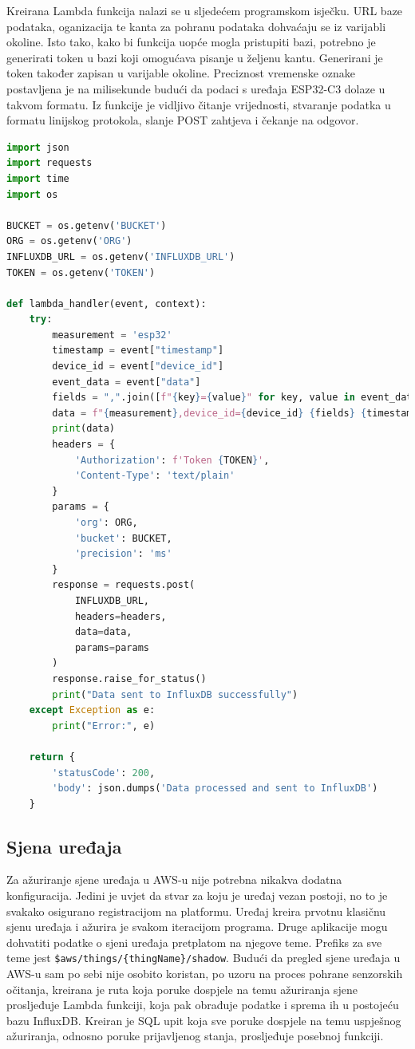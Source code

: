 Kreirana Lambda funkcija nalazi se u sljedećem programskom isječku. URL baze podataka, oganizacija te kanta za pohranu podataka dohvaćaju se iz varijabli okoline. Isto tako, kako bi funkcija uopće mogla pristupiti bazi, potrebno je generirati token u bazi koji omogućava pisanje u željenu kantu. Generirani je token također zapisan u varijable okoline. Preciznost vremenske oznake postavljena je na milisekunde budući da podaci s uređaja ESP32-C3 dolaze u takvom formatu. Iz funkcije je vidljivo čitanje vrijednosti, stvaranje podatka u formatu linijskog protokola, slanje POST zahtjeva i čekanje na odgovor. 

\begin{lstlisting}[caption={Lambda funkcija za slanje podataka u InfluxDB}, language={python}]
import json
import requests
import time
import os

BUCKET = os.getenv('BUCKET')
ORG = os.getenv('ORG')
INFLUXDB_URL = os.getenv('INFLUXDB_URL')
TOKEN = os.getenv('TOKEN')

def lambda_handler(event, context):
	try:
		measurement = 'esp32'
		timestamp = event["timestamp"]
		device_id = event["device_id"]
		event_data = event["data"]
		fields = ",".join([f"{key}={value}" for key, value in event_data.items() if key != "timestamp" and key != "device_id"])
		data = f"{measurement},device_id={device_id} {fields} {timestamp}"
		print(data)
		headers = {
			'Authorization': f'Token {TOKEN}',
			'Content-Type': 'text/plain'
		}
		params = {
			'org': ORG,
			'bucket': BUCKET,
			'precision': 'ms'
		}
		response = requests.post(
			INFLUXDB_URL,
			headers=headers,
			data=data,
			params=params
		)
		response.raise_for_status()
		print("Data sent to InfluxDB successfully")
	except Exception as e:
		print("Error:", e)
	
	return {
		'statusCode': 200,
		'body': json.dumps('Data processed and sent to InfluxDB')
	}
\end{lstlisting}

\subsection{Sjena uređaja}

Za ažuriranje sjene uređaja u AWS-u nije potrebna nikakva dodatna konfiguracija. Jedini je uvjet da stvar za koju je uređaj vezan postoji, no to je svakako osigurano registracijom na platformu. Uređaj kreira prvotnu klasičnu sjenu uređaja i ažurira je svakom iteracijom programa. Druge aplikacije mogu dohvatiti podatke o sjeni uređaja pretplatom na njegove teme. Prefiks za sve teme jest \lstinline|$aws/things/{thingName}/shadow|. Budući da pregled sjene uređaja u AWS-u sam po sebi nije osobito koristan, po uzoru na proces pohrane senzorskih očitanja, kreirana je ruta koja poruke dospjele na temu ažuriranja sjene prosljeđuje Lambda funkciji, koja pak obrađuje podatke i sprema ih u postojeću bazu InfluxDB. Kreiran je SQL upit koja sve poruke dospjele na temu uspješnog ažuriranja, odnosno poruke prijavljenog stanja, prosljeđuje posebnoj funkciji. 

